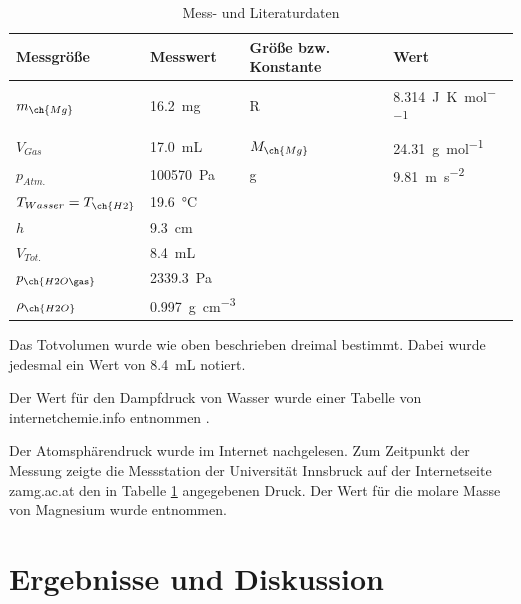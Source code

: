 \documentclass{article}
\begin{document}
      \begin{table}[H]
        \centering
        \caption[Mess- und Literaturdaten, Quelle: Autor]{Mess- und Literaturdaten}
        \label{tab:Messdaten}
          \begin{tabular}{@{}ll|ll@{}}
            \toprule
             Messgröße & Messwert & Größe bzw. Konstante & Wert \\ \midrule
             $m_{\ch{Mg}}$ & \SI[mode=text]{16.2}{\milli\gram} & R & \SI[mode=text]{8.314}{\joule\per\kelvin\per\mol} \\
             $V_{Gas}$ & \SI[mode=text]{17.0}{\milli\liter} & $M_{\ch{Mg}}$ & \SI[mode=text]{24.31}{\gram\per\mole} \\
             $p_{Atm.}$ & \SI[mode=text]{100570}{\pascal} & g & \SI[mode=text]{9.81}{\meter\per\second\squared} \\
             $T_{Wasser}=T_{\ch{H2}}$ & \SI[mode=text]{19.6}{\degreeCelsius} &  &  \\
             $h$ & \SI[mode=text]{9.3}{\centi\meter} &  &  \\
             $V_{Tot.}$ & \SI[mode=text]{8.4}{\milli\liter} &  &  \\ 
             $p_{\ch{H2O\gas}}$ & \SI[mode=text]{2339.3}{\pascal} &  &  \\ 
             $\rho_{\ch{H2O}}$ & \SI[mode=text]{0.997}{\gram\per\cubic\centi\metre} &  &  \\ \bottomrule
          \end{tabular}
      \end{table}      
      
      Das Totvolumen wurde wie oben beschrieben dreimal bestimmt. Dabei wurde jedesmal ein Wert von \SI[mode=text]{8.4}{\milli\liter} notiert.
      
      Der Wert für den Dampfdruck von Wasser wurde einer Tabelle von internetchemie.info entnommen \cite{Dampfdruck}. 
      
      Der Atomsphärendruck wurde im Internet nachgelesen. Zum Zeitpunkt der Messung zeigte die Messstation der Universität Innsbruck auf der Internetseite zamg.ac.at \cite{zamg} den in Tabelle \ref{tab:Messdaten} angegebenen Druck. Der Wert für die molare Masse von Magnesium wurde \cite{PhysicalChemistryAtkings} entnommen.
      
  \section{Ergebnisse und Diskussion}
  
\end{document}
